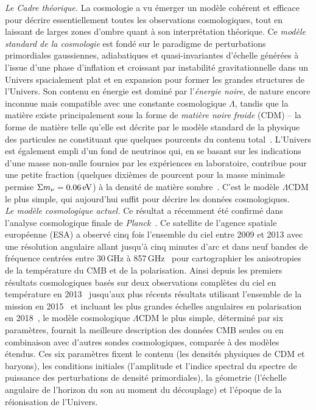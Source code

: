 

\emph{Le Cadre théorique.} La cosmologie a vu émerger un modèle
cohérent et efficace pour décrire essentiellement toutes les
observations cosmologiques, tout en laissant de larges zones d'ombre
quant à son interprétation théorique. Ce \emph{modèle
standard de la cosmologie} est fondé sur le paradigme de perturbations
primordiales gaussiennes, adiabatiques et quasi-invariantes d'échelle
générées à l'issue d'une phase d'inflation et croissant par
instabilité gravitationnelle dans un Univers spacialement plat et en
expansion pour former les grandes structures de l'Univers. Son contenu
en énergie est dominé par l'\emph{énergie noire}, de nature encore
inconnue mais compatible avec une constante cosmologique $\Lambda$, tandis
que la matière existe principalement sous la forme de
\emph{matière noire froide} (CDM) -- la forme de matière telle qu'elle
est décrite par le modèle standard de la physique des particules ne
constituant que quelques pourcents du contenu
total~\citep[pour des mesures récentes,
voir \emph{e.g}][]{Planck2018_cosmo, BOSS2017, eBOSS2019, DES2019,
SNLS2014, PANSTARR2018}. L'Univers est également empli d'un fond de
neutrinos qui, en se basant sur les indications d'une
masse non-nulle fournies par les expériences en laboratoire,
contribue pour une petite fraction (quelques dixièmes de pourcent pour
la masse minimale permise $\Sigma m_\nu = 0.06\,\rm{eV}$) à
la densité de matière sombre~\citep[voir pour une
revue][]{Lesgourgues2006, Lesgourgues_Book}. C'est le modèle
$\Lambda$CDM le plus simple, qui aujourd'hui suffit pour décrire les
données cosmologiques.\\

\emph{Le modèle cosmologique actuel.} Ce résultat a récemment été
confirmé dans l'analyse cosmologique finale
de \emph{Planck}~\citep{Planck2018_cosmo}. Ce satellite de l'agence
spatiale européenne (ESA) a observé cinq fois l'ensemble du ciel entre
2009 et 2013 avec une résolution angulaire allant jusqu'à cinq minutes
d'arc et dans neuf bandes de fréquence centrées entre 30\,GHz à
857\,GHz~ pour cartographier les anisotropies de la
température du CMB et de la polarisation. Ainsi depuis les premiers
résultats cosmologiques basés sur deux observations complètes du ciel
en température en 2013~ jusqu'aux plus récents
résultats utilisant l'ensemble de la mission en
2015~ et incluant les plus grandes échelles
angulaires en polarisation en 2018~, le modèle
cosmologique $\Lambda$CDM le plus simple, déterminé par six
paramètres, fournit la meilleure description des données CMB seules ou
en combinaison avec d'autres sondes cosmologiques, comparée à des
modèles étendus. Ces six paramètres fixent le contenu (les densités
physiques de CDM et baryons), les conditions initiales (l'amplitude et
l'indice spectral du spectre de puissance des perturbations de densité
primordiales), la géometrie (l'échelle angulaire de l'horizon du son
au moment du découplage) et l'époque de la réionisation de l'Univers. 

